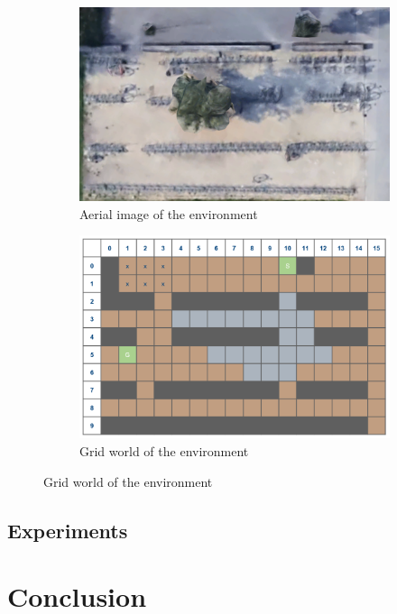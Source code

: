 \documentclass[10pt,a4paper,twocolumn]{article}
\begin{document}
\begin{figure}[h]
\begin{subfigure}[b]{0.5\textwidth}
	\includegraphics[width=\textwidth]{google}
	\caption{Aerial image of the environment}
	\label{fig:google}
\end{subfigure}
\begin{subfigure}[b]{0.5\textwidth}
	\includegraphics[width=\textwidth]{gridworld}
	\caption{Grid world of the environment}
	\label{fig:gridworld}
\end{subfigure}
\end{figure}






\cite{vasquez2014inverse}
\cite{zhifei2012survey}
\subsection{Experiments}

\section{Conclusion}

 

\end{document}

